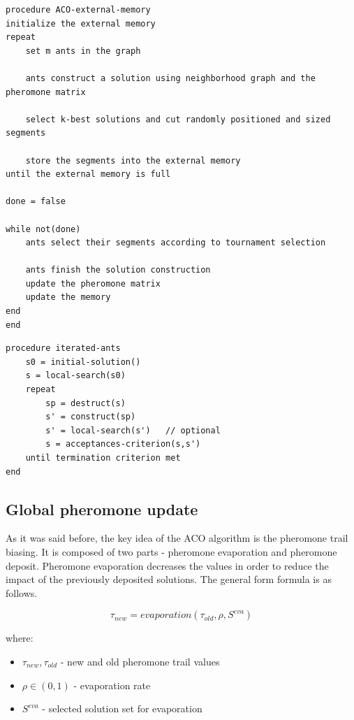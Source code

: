 \documentclass[11pt,a4paper,oneside]{book}
\begin{document}
\begin{minipage}[c, breaklines=true]{0.95\textwidth}
\begin{lstlisting}[caption={External memory iteration pseudo-code}, label={lst:ext-mem}]
procedure ACO-external-memory
initialize the external memory
repeat
	set m ants in the graph
	
	ants construct a solution using neighborhood graph and the pheromone matrix
	
	select k-best solutions and cut randomly positioned and sized segments
	
	store the segments into the external memory
until the external memory is full

done = false

while not(done)
	ants select their segments according to tournament selection
	
	ants finish the solution construction
	update the pheromone matrix
	update the memory
end
end
\end{lstlisting}
\end{minipage}


\begin{minipage}[c, breaklines=true]{0.95\textwidth}
\begin{lstlisting}[caption={General iterated ants pseudo-code}, label={lst:iterated-ants}]
procedure iterated-ants
	s0 = initial-solution()
	s = local-search(s0)
	repeat
		sp = destruct(s)
		s' = construct(sp)
		s' = local-search(s')   // optional
		s = acceptances-criterion(s,s')
	until termination criterion met
end
\end{lstlisting}
\end{minipage}



\subsection{Global pheromone update}
As it was said before, the key idea of the ACO algorithm is the pheromone trail biasing. It is composed of two parts - pheromone evaporation and pheromone deposit. Pheromone evaporation decreases the values in order to reduce the impact of the previously deposited solutions. The general form formula is as follows.

\begin{equation}
\tau_{new}=evaporation(\tau_{old}, \rho, S^{eva})
\end{equation}

where:
\begin{itemize}
\item $\tau_{new}, \tau_{old}$ - new and old pheromone trail values
\item $\rho \in (0,1)$ - evaporation rate
\item $S^{eva}$ - selected solution set for evaporation
\end{itemize}
\end{document}
